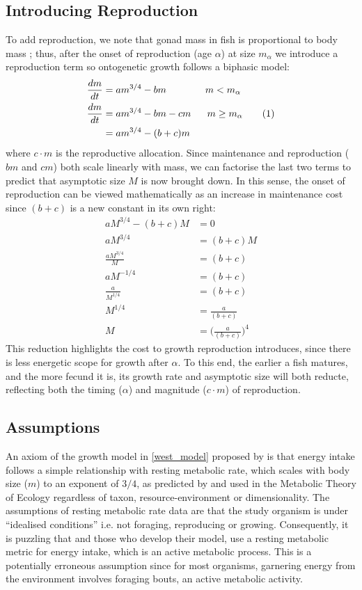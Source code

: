 \documentclass[a4paper]{article} %
\newcommand\numberthis{\addtocounter{equation}{1}\tag{\theequation}}
\begin{document}
\subsection{Introducing Reproduction}
To add reproduction, we note that gonad mass in fish is proportional to body mass \autocite{Charnov2001, Roff1983, peters1983, kozlowski1996}; thus, after the onset of reproduction (age $\alpha$) at size $m_{\alpha}$ we introduce a reproduction term so ontogenetic growth follows a biphasic model:
\begin{align*}
    \frac{dm}{dt} &= am^{3/4} - bm \ \ \ \ \ \ \ \ \ \ \ \ m < m_{\alpha} \\
    \frac{dm}{dt} &= am^{3/4} - bm - cm \ \ \ \ \ m \geq m_{\alpha} \numberthis \label{charnov2001} \\
    &= am^{3/4} - (b+c)m
\end{align*}
where $c \cdot m$ is the reproductive allocation. Since maintenance and reproduction ($bm$ and $cm$) both scale linearly with mass, we can factorise the last two terms to predict that asymptotic size $M$ is now brought down. In this sense, the onset of reproduction can be viewed mathematically as an increase in maintenance cost since $(b+c)$ is a new constant in its own right:
\begin{align*}
    aM^{3/4} - (b+c)M &= 0 \\
    aM^{3/4} &= (b+c)M \\
    \frac{aM^{3/4}}{M} &= (b+c) \\
    aM^{-1/4} &= (b+c) \\
    \frac{a}{M^{1/4}} &= (b+c) \\
    M^{1/4} &= \frac{a}{(b+c)} \\
    M &= \Bigg(\frac{a}{(b+c)}\Bigg)^4
\end{align*}
This reduction highlights the cost to growth reproduction introduces, since there is less energetic scope for growth after $\alpha$. To this end, the earlier a fish matures, and the more fecund it is, its growth rate and asymptotic size will both reducte, reflecting both the timing ($\alpha$) and magnitude ($c\cdot{m}$) of reproduction.

\subsection{Assumptions}
An axiom of the growth model in \eqref{west_model} proposed by \cite{West2001} is that energy intake follows a simple relationship with resting metabolic rate, which scales with body size ($m$) to an exponent of $3/4$, as predicted by \cite{West1997} and used in the Metabolic Theory of Ecology \autocite{Brown2004} regardless of taxon, resource-environment or dimensionality. The assumptions of resting metabolic rate data are that the study organism is under ``idealised conditions'' i.e. not foraging, reproducing or growing. Consequently, it is puzzling that \cite{West2001} and those who develop their model, use a resting metabolic metric for energy intake, which is an active metabolic process. This is a potentially erroneous assumption since for most organisms, garnering energy from the environment involves foraging bouts, an active metabolic activity. 
\end{document}
